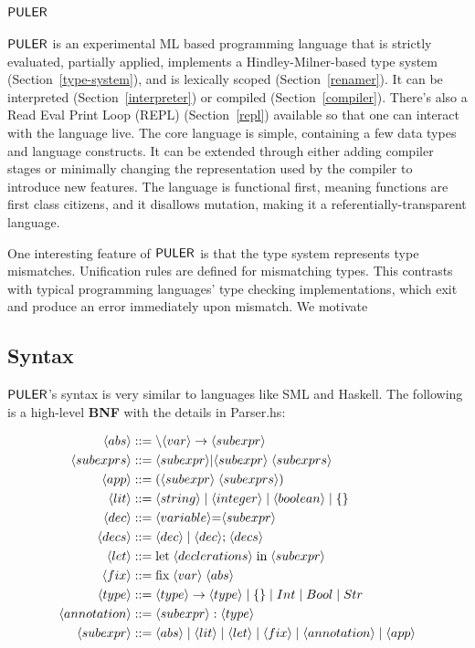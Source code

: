 \chapter{$\mathsf{PULER}$}
\label{puler}
\thispagestyle{myheadings}

$\mathsf{PULER}$ is an experimental ML based programming language that is strictly evaluated, partially applied, implements a Hindley-Milner-based \cite{Hindley-Milner} type system (Section~\ref{type-system}), and is lexically scoped (Section~\ref{renamer}). It can be interpreted (Section~\ref{interpreter}) or compiled (Section~\ref{compiler}). There's also a Read Eval Print Loop (REPL) (Section~\ref{repl}) available so that one can interact with the language live. The core language is simple, containing a few data types and language constructs. It can be extended through either adding compiler stages or minimally changing the representation used by the compiler to introduce new features. The language is functional first, meaning functions are first class citizens, and it disallows mutation, making it a referentially-transparent language.
    
One interesting feature of $\mathsf{PULER}$ is that the type system represents type mismatches. Unification rules are defined for mismatching types. This contrasts with typical programming languages' type checking implementations, which exit and produce an error immediately upon mismatch. We motivate 

\section{Syntax}\label{syntax}
$\mathsf{PULER}$'s syntax is very similar to languages like SML and Haskell. The following is a high-level \textbf{BNF}\cite{BNF} with the details in Parser.hs:

\begin{align*}
     \langle abs \rangle & ::= \backslash \langle var \rangle \to \langle subexpr \rangle \\
     \langle subexprs \rangle & :: = \langle subexpr \rangle | \langle subexpr \rangle \; \langle subexprs \rangle\\
     \langle app \rangle & ::= (\langle subexpr \rangle \; \langle subexprs \rangle)\\
     \langle lit \rangle & ::= \langle string \rangle \; | \; \langle integer \rangle \; | \; \langle boolean \rangle \; | \; \{\} \\
     \langle dec \rangle & ::= \langle variable \rangle \text{=} \langle subexpr \rangle \\
     \langle decs \rangle & ::= \langle dec \rangle \; | \; \langle dec \rangle\text{;} \; \langle decs \rangle \\
     \langle let \rangle & ::= \text{let}\; \langle declerations \rangle \; \text{in} \; \langle subexpr \rangle \\
     \langle fix \rangle & ::= \text{fix} \; \langle var \rangle \; \langle abs \rangle \\
     \langle type \rangle & ::= \langle type \rangle \to \langle type \rangle \; | \; \{\} \; | \; Int \; | \; Bool \; | \; Str \\
     \langle annotation \rangle & ::= \langle subexpr \rangle : \langle type \rangle \\
     \langle subexpr \rangle & ::= \langle abs \rangle \; | \; \langle lit \rangle \; | \; \langle let \rangle \; | \; \langle fix \rangle \; | \; \langle annotation \rangle \; | \; \langle app \rangle
\end{align*}

